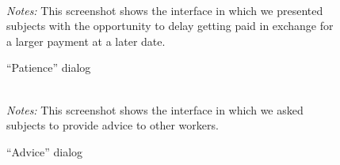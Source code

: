 \documentclass[11pt]{article}
\begin{document}
\begin{figure}
  \caption{``Patience'' dialog \label{fig:patience}}
\centering
\begin{minipage}{0.85\linewidth}
\\
\footnotesize \emph{Notes:} This screenshot shows the interface in
which we presented subjects with the opportunity to delay getting paid
in exchange for a larger payment at a later date. 
\end{minipage}
\end{figure}

\begin{figure}
  \caption{``Advice'' dialog \label{fig:advice}}
\centering
\begin{minipage}{0.85\linewidth}
\\
\footnotesize \emph{Notes:} This screenshot shows the interface in
which we asked subjects to provide advice to other workers. 
\end{minipage}
\end{figure}
\end{document}
